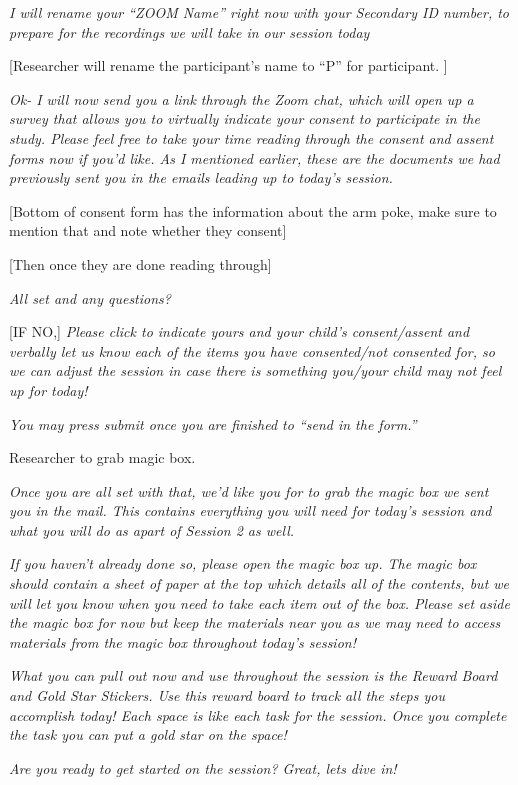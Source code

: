 \documentclass[]{book}
\begin{document}
\emph{I will rename your ``ZOOM Name'' right now with your Secondary ID number, to prepare for the recordings we will take in our session today}

{[}Researcher will rename the participant's name to ``P'' for participant. {]}

\emph{Ok- I will now send you a link through the Zoom chat, which will open up a survey that allows you to virtually indicate your consent to participate in the study. Please feel free to take your time reading through the consent and assent forms now if you'd like. As I mentioned earlier, these are the documents we had previously sent you in the emails leading up to today's session.}

{[}Bottom of consent form has the information about the arm poke, make sure to mention that and note whether they consent{]}

{[}Then once they are done reading through{]}

\emph{All set and any questions?}

{[}IF NO,{]} \emph{Please click to indicate yours and your child's consent/assent and verbally let us know each of the items you have consented/not consented for, so we can adjust the session in case there is something you/your child may not feel up for today!}

\emph{You may press submit once you are finished to ``send in the form.''}

Researcher to grab magic box.

\emph{Once you are all set with that, we'd like you for to grab the magic box we sent you in the mail. This contains everything you will need for today's session and what you will do as apart of Session 2 as well.}

\emph{If you haven't already done so, please open the magic box up. The magic box should contain a sheet of paper at the top which details all of the contents, but we will let you know when you need to take each item out of the box. Please set aside the magic box for now but keep the materials near you as we may need to access materials from the magic box throughout today's session!}

\emph{What you can pull out now and use throughout the session is the Reward Board and Gold Star Stickers. Use this reward board to track all the steps you accomplish today! Each space is like each task for the session. Once you complete the task you can put a gold star on the space!}

\emph{Are you ready to get started on the session? Great, lets dive in!}
\end{document}
